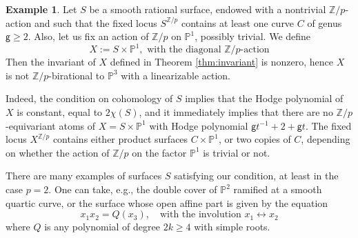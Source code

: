 \documentclass[12pt,a4paper]{amsart}
\theoremstyle{definition}
\newtheorem{example}[theorem]{Example}
\theoremstyle{remark}
\newcommand{\Z}{\mathbb{Z}}
\begin{document}
\begin{example}\label{ex:product=with-line}
Let $S$ be a smooth rational surface,  endowed with a nontrivial $\Z/p$-action and such that the fixed locus $S^{\Z/p}$ contains at least one curve $C$ of genus $\mathsf g\ge 2$. Also, let us fix an action of $\Z/p$ on $\mathbb P^1$, possibly trivial. We define
 $$X:=S\times \mathbb P^1,\text{ with the diagonal }\Z/p\text{-action}$$
 Then the invariant of $X$ defined in Theorem \ref{thm:invariant} is nonzero, hence $X$ is not $\Z/p$-birational to $\mathbb P^3$ with a linearizable action. 

 Indeed, the condition on cohomology of $S$ implies that the Hodge polynomial of $X$ is constant, equal to $2\chi(S)$, and it immediately implies that there are no $\Z/p$-equivariant atoms of $X=S\times\mathbb P^1$ with Hodge polynomial $\mathsf g t^{-1}+2+\mathsf g t$. The fixed locus $X^{\Z/p}$ contains either product surfaces $C\times\mathbb P^1$, or two copies of $C$, depending on whether the action of $\Z/p$ on the factor $\mathbb P^1$ is trivial or not.

 There are many examples of surfaces $S$ satisfying our condition, at least in the case $p=2$. One can take, e.g., the double cover of $\mathbb P^2$ ramified at a smooth quartic curve, or the surface   whose open affine part is given by the equation 
 $$x_1 x_2=Q(x_3),\quad \text{with the involution }x_1\leftrightarrow x_2$$
 where $Q$ is any polynomial of degree $2k\ge 4$ with simple roots.


\end{example}
\end{document}
